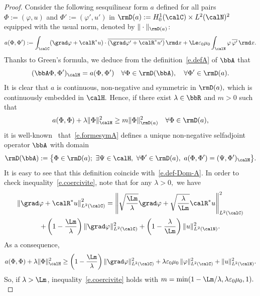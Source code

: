 \begin{proof}
Consider the following sesquilinear form $a$ defined for all pairs $\Phi := (\varphi,u)$ and $\Phi' := (\varphi',u')$ in $\rmD(a) := H^1_0(\calC) \times L^2(\calN)^2$ equipped with the usual norm, denoted by $\| \cdot \|_{\rmD(a)}$:
\[
a(\Phi,\Phi') :=
\int_\calC (\grad\varphi + \calR^*u) \cdot \overline{(\grad\varphi' + \calR^* u')}\,\rmd x + \Le \varepsilon_0 \mu_0 \int_\calN \varphi \, \overline{\varphi'} \, \rmd x.
\]
Thanks to Green's formula, we deduce from the definition~\eqref{e.defA} of $\bbA$ that
\begin{equation}\label{e.formesymA}
(\bbA \Phi, \Phi')_\calH = a(\Phi,\Phi')
\quad \forall \Phi \in \rmD(\bbA), \quad \forall \Phi' \in \rmD(a).
\end{equation}
It is clear that $a$ is continuous, non-negative and symmetric in $\rmD(a),$ which is continuously embedded in $\calH.$ Hence, if there exist $\lambda \in \bbR$ and $m>0$ such that
\begin{equation}\label{e.coercivite}
a(\Phi,\Phi) + \lambda \| \Phi \|_\calH^2 \geq m \| \Phi \|_{\rmD(a)}^2
\quad \forall \Phi \in \rmD(a),
\end{equation}
it is well-known~\cite[Theorem~2.1, p.~322]{Kato-84} that~\eqref{e.formesymA} defines a unique non-negative selfadjoint operator $\bbA$ with domain
\[
\rmD(\bbA) := \big\{ \Phi \in \rmD(a);\ \exists \Psi \in \calH,\ \forall \Phi' \in \rmD(a), \ a(\Phi,\Phi')=(\Psi,\Phi')_\calH \big\}.
\]
It is easy to see that this definition coincide with~\eqref{e.def-Dom-A}. In order to check inequality~\eqref{e.coercivite}, note that for any $\lambda > 0,$ we have
\begin{multline*}
\left\| \grad \varphi + \calR^* u\right\|_{L^2(\calC)}^2 =
\left\| \sqrt{\frac{\Lm}{\lambda}} \grad \varphi + \sqrt{\frac{\lambda}{\Lm}} \calR^* u\right\|_{L^2(\calC)}^2 \\
+ \left(1 - \frac{\Lm}{\lambda} \right) \| \grad \varphi\|_{L^2(\calC)}^2 + \left(1 - \frac{\lambda}{\Lm} \right) \| u \|_{L^2(\calN)}^2.
\end{multline*}
As a consequence,
\[
a(\Phi,\Phi) + \lambda \| \Phi \|_\calH^2
\geq \left(1 - \frac{\Lm}{\lambda} \right) \| \grad \varphi\|_{L^2(\calC)}^2 + \lambda \varepsilon_0 \mu_0\, \| \varphi \|_{L^2(\calC)}^2 + \| u \|_{L^2(\calN)}^2.
\]
So, if $\lambda>\Lm$, inequality~\eqref{e.coercivite} holds with $m = \min (1- \Lm/\lambda, \lambda \varepsilon_0 \mu_0, 1).$
\end{proof}



